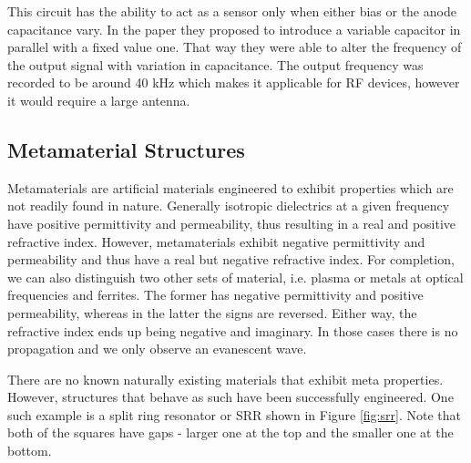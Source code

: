 \documentclass[11pt,a4paper]{article}
\begin{document}
This circuit has the ability to act as a sensor only when either bias or the anode capacitance vary. In the paper they proposed to introduce a variable capacitor in parallel with a fixed value one. That way they were able to alter the frequency of the output signal with variation in capacitance. The output frequency was recorded to be around 40 kHz which makes it applicable for RF devices, however it would require a large antenna.

\subsection{Metamaterial Structures}

Metamaterials are artificial materials engineered to exhibit properties which are not readily found in nature. Generally isotropic dielectrics at a given frequency have positive permittivity and permeability, thus resulting in a real and positive refractive index. However, metamaterials exhibit negative permittivity and permeability and thus have a real but negative refractive index. For completion, we can also distinguish two other sets of material, i.e. plasma or metals at optical frequencies and ferrites. The former has negative permittivity and positive permeability, whereas in the latter the signs are reversed. Either way, the refractive index ends up being negative and imaginary. In those cases there is no propagation and we only observe an evanescent wave.

There are no known naturally existing materials that exhibit meta properties. However, structures that behave as such have been successfully engineered. One such example is a split ring resonator or SRR shown in Figure \ref{fig:srr}. Note that both of the squares have gaps - larger one at the top and the smaller one at the bottom.
\end{document}
